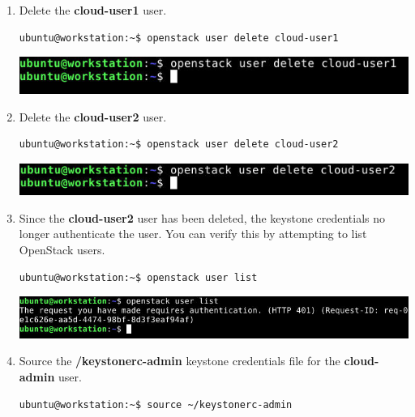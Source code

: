 \documentclass[letterpaper, 12pt]{article}
\begin{document}
\begin{enumerate}
    \item Delete the \textbf{cloud-user1} user.
\begin{lstlisting}
ubuntu@workstation:~$ openstack user delete cloud-user1
\end{lstlisting}

    \begin{center}
        \includegraphics[width=\linewidth]{images/part6/step8.png}
    \end{center}

    \item Delete the \textbf{cloud-user2} user.
\begin{lstlisting}
ubuntu@workstation:~$ openstack user delete cloud-user2
\end{lstlisting}    

    \begin{center}
        \includegraphics[width=\linewidth]{images/part6/step9.png}
    \end{center}

    \item Since the \textbf{cloud-user2} user has been deleted, the keystone credentials no longer authenticate the
    user. You can verify this by attempting to list OpenStack users.
\begin{lstlisting}
ubuntu@workstation:~$ openstack user list
\end{lstlisting}

    \begin{center}
        \includegraphics[width=\linewidth]{images/part6/step10.png}
    \end{center}

    \item Source the \textbf{\texttildemid/keystonerc-admin} keystone credentials file for the \textbf{cloud-admin}
    user.
\begin{lstlisting}
ubuntu@workstation:~$ source ~/keystonerc-admin
\end{lstlisting}


\end{enumerate}
\end{document}
